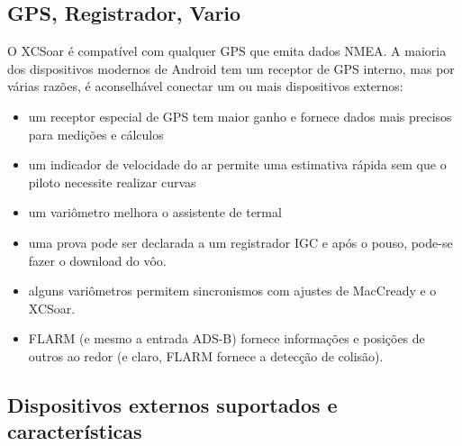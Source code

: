 \subsection*{GPS, Registrador, Vario}

O XCSoar é compatível com qualquer GPS que emita dados NMEA.  A maioria dos dispositivos modernos de Android tem um receptor de GPS interno, mas por várias razões, é aconselhável conectar um ou mais dispositivos externos:

\begin{itemize}
\item um receptor especial de GPS tem maior ganho e fornece dados mais precisos para medições e cálculos
\item um indicador de velocidade do ar permite uma estimativa rápida sem que o piloto necessite realizar curvas
\item um variômetro melhora o assistente de termal
\item uma prova pode ser declarada a um registrador IGC e após o pouso, pode-se fazer o download do vôo. 
\item alguns variômetros permitem sincronismos com ajustes de MacCready e o XCSoar.
\item FLARM  (e mesmo a entrada ADS-B) fornece informações e posições de outros ao redor (e claro, FLARM fornece a detecção de colisão).
\end{itemize}

\subsection*{Dispositivos externos suportados e características}
\label{sec:supported-varios}


